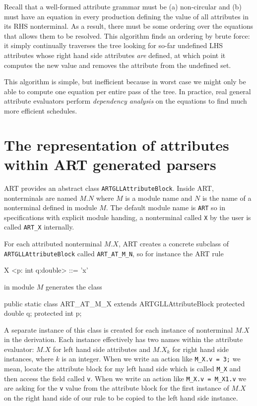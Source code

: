 Recall that a well-formed attribute grammar must be (a) non-circular
and (b) must have an equation in every production defining the value
of all attributes in its RHS nonterminal.  As a result, there must be
some ordering over the equations that allows them to be resolved. This
algorithm finds an ordering by brute force: it simply continually
traverses the tree looking for so-far undefined LHS attributes whose
right hand side attributes {\em are} defined, at which point it
computes the new value and removes the attribute from the undefined
set.

This algorithm is simple, but inefficient because in worst case we
might only be able to compute one equation per entire pass of the
tree. In practice, real general attribute evaluators perform {\em
  dependency analysis} on the equations to find much more efficient
schedules.

\section{The representation of attributes within ART generated parsers}

ART provides an abstract class \verb+ARTGLLAttributeBlock+. Inside
ART, nonterminals are named $M.N$ where $M$ is a module name and $N$
is the name of a nonterminal defined in module $M$. The default module
name is \verb+ART+ so in specifications with explicit module
handing, a nonterminal called {\tt X} by the user is called
\verb+ART_X+ internally.

For each attributed nonterminal $M.X$, ART creates a concrete subclass of \verb+ARTGLLAttributeBlock+ called \verb+ART_AT_M_N+, so for instance the ART rule

\begin{bnfblock}
X <p: int q:double> ::= 'x'
\end{bnfblock}
in module $M$ generates the class
\begin{codeblock}
  public static class ART_AT_M_X extends ARTGLLAttributeBlock {
    protected double q;
    protected int p;
  }
\end{codeblock}

A separate instance of this class is created for each instance of
nonterminal $M.X$ in the derivation. Each instance effectively has two
names within the attribute evaluator: $M.X$ for left hand side
attributes and $M.X_k$ for right hand side instances, where $k$ is an
integer. When we write an action like \verb+M_X.v = 3;+ we mean, locate
the attribute block for my left hand side which is called \verb+M_X+
and then access the field called \verb+v+. When we write an action
like \verb+M_X.v = M_X1.v+ we are asking for the {\tt v} value from the
attribute block for the first instance of $M.X$ on the right hand side
of our rule to be copied to the left hand side instance.

